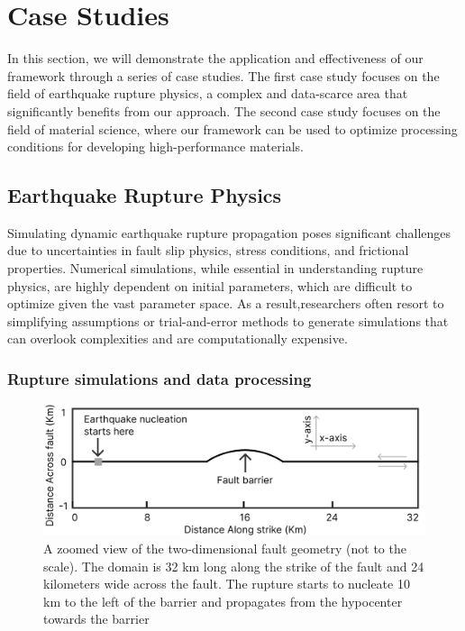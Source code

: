 \documentclass{article}
\begin{document}
\section{Case Studies}
In this section, we will demonstrate the application and effectiveness of our framework through a series of case studies. The first case study focuses on the field of earthquake rupture physics, a complex and data-scarce area that significantly benefits from our approach. The second case study focuses on the field of material science, where our framework can be used to optimize processing conditions for developing high-performance materials.

\subsection{Earthquake Rupture Physics}
Simulating dynamic earthquake rupture propagation poses significant challenges due to uncertainties in fault slip physics, stress conditions, and frictional properties. Numerical simulations, while essential in understanding rupture physics, are highly dependent on initial parameters, which are difficult to optimize given the vast parameter space. As a result,researchers often resort to simplifying assumptions or trial-and-error methods to generate simulations that can overlook complexities and are computationally expensive.

\subsubsection{Rupture simulations and data processing}
\begin{figure}[ht]
    \begin{center}
        \includegraphics[scale=0.6]{figures/rupture_domain.png}
    \end{center}
    \caption{A zoomed view of the two-dimensional fault geometry (not to the scale). The domain is 32 km long along the strike of the fault and 24 kilometers wide across the fault. The rupture starts to nucleate 10 km to the left of the barrier and propagates from the hypocenter towards the barrier}
    \label{fig:rupture_domain}
\end{figure}
\end{document}
